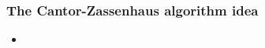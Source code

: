 \begin{frame}
\frametitle{The Cantor-Zassenhaus algorithm idea}
\begin{itemize}
\item 
\end{itemize}
\end{frame}
